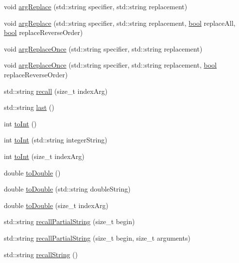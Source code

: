 \begin{DoxyCompactItemize}
\item 
void \hyperlink{classStringstack_a73332f209b954e23d6486a7439a1d74a}{arg\-Replace} (std\-::string specifier, std\-::string replacement)
\item 
void \hyperlink{classStringstack_af30cd5b798f448c0d4f73b013ab62eb7}{arg\-Replace} (std\-::string specifier, std\-::string replacement, \hyperlink{structs_8h_ad5c9d4ba3dc37783a528b0925dc981a0}{bool} replace\-All, \hyperlink{structs_8h_ad5c9d4ba3dc37783a528b0925dc981a0}{bool} replace\-Reverse\-Order)
\item 
void \hyperlink{classStringstack_a405bd0c49154f672b01474697a2dac45}{arg\-Replace\-Once} (std\-::string specifier, std\-::string replacement)
\item 
void \hyperlink{classStringstack_aa1082f1a7d5d0669b2249dae76ac3a06}{arg\-Replace\-Once} (std\-::string specifier, std\-::string replacement, \hyperlink{structs_8h_ad5c9d4ba3dc37783a528b0925dc981a0}{bool} replace\-Reverse\-Order)
\item 
std\-::string \hyperlink{classStringstack_a1ffee5cf0fac3be196cb6a2da5248c68}{recall} (size\-\_\-t index\-Arg)
\item 
std\-::string \hyperlink{classStringstack_a6451d4ae727082e186bc1e823787cfcd}{last} ()
\item 
int \hyperlink{classStringstack_a8e8b15949b4e1a48c0b64f7631a17e5b}{to\-Int} ()
\item 
int \hyperlink{classStringstack_a225f2ec993cdc23513eddc64eec914b8}{to\-Int} (std\-::string integer\-String)
\item 
int \hyperlink{classStringstack_a2bf7ea8186405b71cf4c401bd9593708}{to\-Int} (size\-\_\-t index\-Arg)
\item 
double \hyperlink{classStringstack_a3ba9b3e887c482b2dab3fe3f4010fa2d}{to\-Double} ()
\item 
double \hyperlink{classStringstack_a743b4fca4f2dde9b593cc4d4cb8d3a3d}{to\-Double} (std\-::string double\-String)
\item 
double \hyperlink{classStringstack_a3b4ee6ffffd6b0686854e20d4c126c8d}{to\-Double} (size\-\_\-t index\-Arg)
\item 
std\-::string \hyperlink{classStringstack_aac6c5200c1210f181f9c84885e85dc75}{recall\-Partial\-String} (size\-\_\-t begin)
\item 
std\-::string \hyperlink{classStringstack_abd25b981a984a4bfc23eaff79fa6006e}{recall\-Partial\-String} (size\-\_\-t begin, size\-\_\-t arguments)
\item 
std\-::string \hyperlink{classStringstack_aaf7895e4f440740cc8170980c1140be3}{recall\-String} ()

\end{DoxyCompactItemize}
